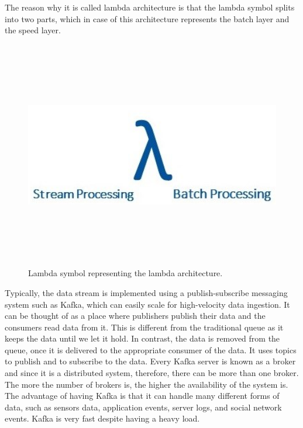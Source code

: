 The reason why it is called lambda architecture is that the lambda symbol splits into two parts, which in case of this architecture represents the batch layer and the speed layer. 

\begin{figure}[htpb]
	\centering
	\includegraphics[width=12cm,height=10cm,keepaspectratio=true]{images/lambda_new}
	\caption{
		Lambda symbol representing the lambda architecture.
	}
	\label{fig:lambda}
\end{figure}

Typically, the data stream is implemented using a publish-subscribe messaging system such as Kafka, which can easily scale for high-velocity data ingestion. It can be thought of as a place where publishers publish their data and the consumers read data from it. This is different from the traditional queue as it keeps the data until we let it hold. In contrast, the data is removed from the queue, once it is delivered to the appropriate consumer of the data. It uses topics to publish and to subscribe to the data. Every Kafka server is known as a broker and since it is a distributed system, therefore, there can be more than one broker. The more the number of brokers is, the higher the availability of the system is. The advantage of having Kafka is that it can handle many different forms of data, such as sensors data, application events, server logs, and social network events. Kafka is very fast despite having a heavy load.

